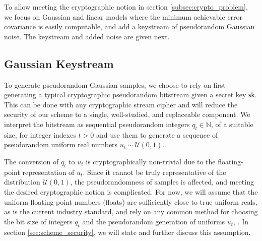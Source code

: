 \documentclass[letterpaper, 10 pt, conference]{ieeeconf}
\begin{document}
To allow meeting the cryptographic notion in section \mbox{\ref{subsec:crypto_problem}}, we focus on Gaussian and linear models where the minimum achievable error covariance is easily computable, and add a keystream of pseudorandom Gaussian noise. The keystream and added noise are given next.

% 
% 

\subsection{Gaussian Keystream}\label{subsec:gaussian_keystream}
To generate pseudorandom Gaussian samples, we choose to rely on first generating a typical cryptographic pseudorandom bitstream given a secret key $\mathsf{sk}$. This can be done with any cryptographic stream cipher and will reduce the security of our scheme to a single, well-studied, and replaceable component. We interpret the bitstream as sequential pseudorandom integers $q_t \in \mathbb{N}$, of a suitable size, for integer indexes $t>0$ and use them to generate a sequence of pseudorandom uniform real numbers $u_t\ \dot{\sim}\ \mathcal{U}(0,1)$.

The conversion of $q_t$ to $u_t$ is cryptographically non-trivial due to the floating-point representation of $u_t$. Since it cannot be truly representative of the distribution $\mathcal{U}(0,1)$, the pseudorandomness of samples is affected, and meeting the desired cryptographic notion is complicated. For now, we will assume that the uniform floating-point numbers (floats) are sufficiently close to true uniform reals, as is the current industry standard, and rely on any common method for choosing the bit size of integers $q_t$ and the pseudorandom generation of uniforms $u_t$, \cite{goualardGeneratingRandomFloatingPoint2020}. In section \ref{sec:scheme_security}, we will state and further discuss this assumption.
\end{document}
